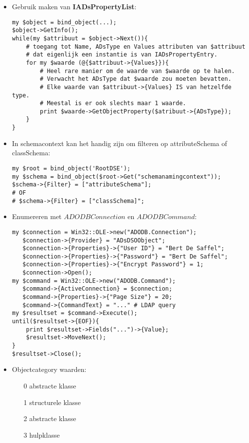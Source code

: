 \documentclass{report}
\begin{document}
\begin{itemize}
    \item Gebruik maken van \textbf{IADsPropertyList}:
    \begin{lstlisting}
my $object = bind_object(...);
$object->GetInfo();
while(my $attribuut = $object->Next()){
    # toegang tot Name, ADsType en Values attributen van $attribuut
    # dat eigenlijk een instantie is van IADsPropertyEntry.
    for my $waarde (@{$attribuut->{Values}}){
        # Heel rare manier om de waarde van $waarde op te halen.
        # Verwacht het ADsType dat $waarde zou moeten bevatten.
        # Elke waarde van $attribuut->{Values} IS van hetzelfde type.
        # Meestal is er ook slechts maar 1 waarde.
        print $waarde->GetObjectProperty($atribuut->{ADsType});
    }
}
    \end{lstlisting}
    \item In schemacontext kan het handig zijn om filteren op attributeSchema of classSchema:
    \begin{lstlisting}
my $root = bind_object('RootDSE');
my $schema = bind_object($root->Get("schemanamingcontext"));
$schema->{Filter} = ["attributeSchema"];
# OF
# $schema->{Filter} = ["classSchema]";
    \end{lstlisting}

    \item Enumereren met $ADODBConnection$ en $ADODBCommand$:
    \begin{lstlisting}
my $connection = Win32::OLE->new("ADODB.Connection");
   $connection->{Provider} = "ADsDSOObject";
   $connection->{Properties}->{"User ID"} = "Bert De Saffel";
   $connection->{Properties}->{"Password"} = "Bert De Saffel";
   $connection->{Properties}->{"Encrypt Password"} = 1;
   $connection->Open();
my $command = Win32::OLE->new("ADODB.Command");
   $command->{ActiveConnection} = $connection;
   $command->{Properties}->{"Page Size"} = 20;
   $command->{CommandText} = "..." # LDAP query
my $resultset = $command->Execute();
until($resultset->{EOF}){
    print $resultset->Fields("...")->{Value};
    $resultset->MoveNext();
}
$resultset->Close();
    \end{lstlisting}
    \item Objectcategory waarden:
    \begin{enumerate}
        \item[0] abstracte klasse
        \item[1] structurele klasse
        \item[2] abstracte klasse
        \item[3] hulpklasse
    \end{enumerate}

	
\end{itemize}
\end{document}
